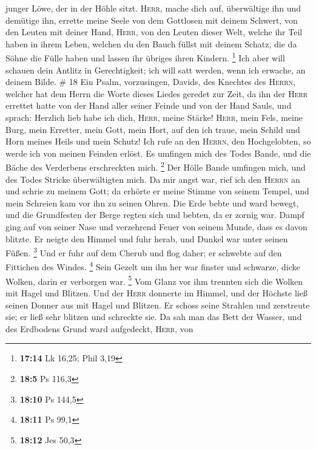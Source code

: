 junger Löwe, der in der Höhle sitzt.  \textsc{Herr},
mache dich auf, überwältige ihn und demütige ihn, errette meine Seele
von dem Gottlosen mit deinem Schwert,  von den Leuten mit
deiner Hand, \textsc{Herr}, von den Leuten dieser Welt, welche ihr Teil
haben in ihrem Leben, welchen du den Bauch füllst mit deinem Schatz, die
da Söhne die Fülle haben und lassen ihr übriges ihren Kindern.
\footnote{\textbf{17:14} Lk 16,25; Phil 3,19}  Ich aber
will schauen dein Antlitz in Gerechtigkeit; ich will satt werden, wenn
ich erwache, an deinem Bilde. \# 18  Ein Psalm,
vorzusingen, Davids, des Knechtes des \textsc{Herrn}, welcher hat dem
Herrn die Worte dieses Liedes geredet zur Zeit, da ihn der \textsc{Herr}
errettet hatte von der Hand aller seiner Feinde und von der Hand Sauls,
 und sprach: Herzlich lieb habe ich dich, \textsc{Herr},
meine Stärke!  \textsc{Herr}, mein Fels, meine Burg, mein
Erretter, mein Gott, mein Hort, auf den ich traue, mein Schild und Horn
meines Heils und mein Schutz!  Ich rufe an den
\textsc{Herrn}, den Hochgelobten, so werde ich von meinen Feinden
erlöst.  Es umfingen mich des Todes Bande, und die Bäche
des Verderbens erschreckten mich. \footnote{\textbf{18:5} Ps 116,3}
 Der Hölle Bande umfingen mich, und des Todes Stricke
überwältigten mich.  Da mir angst war, rief ich den
\textsc{Herrn} an und schrie zu meinem Gott; da erhörte er meine Stimme
von seinem Tempel, und mein Schreien kam vor ihn zu seinen Ohren.
 Die Erde bebte und ward bewegt, und die Grundfesten der
Berge regten sich und bebten, da er zornig war.  Dampf
ging auf von seiner Nase und verzehrend Feuer von seinem Munde, dass es
davon blitzte.  Er neigte den Himmel und fuhr herab, und
Dunkel war unter seinen Füßen. \footnote{\textbf{18:10} Ps 144,5}
 Und er fuhr auf dem Cherub und flog daher; er schwebte
auf den Fittichen des Windes. \footnote{\textbf{18:11} Ps 99,1}
 Sein Gezelt um ihn her war finster und schwarze, dicke
Wolken, darin er verborgen war. \footnote{\textbf{18:12} Jes 50,3}
 Vom Glanz vor ihm trennten sich die Wolken mit Hagel und
Blitzen.  Und der \textsc{Herr} donnerte im Himmel, und
der Höchste ließ seinen Donner aus mit Hagel und Blitzen.
 Er schoss seine Strahlen und zerstreute sie; er ließ
sehr blitzen und schreckte sie.  Da sah man das Bett der
Wasser, und des Erdbodens Grund ward aufgedeckt, \textsc{Herr}, von
